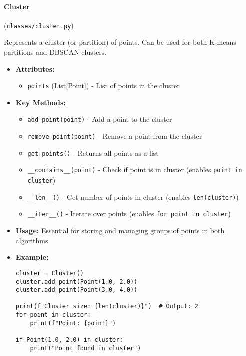 \documentclass[
english,
smallborders
]{i6prcsht}
\begin{document}
\vspace*{0.3cm}

\paragraph{Cluster} (\texttt{classes/cluster.py})

Represents a cluster (or partition) of points. Can be used for both K-means partitions and DBSCAN clusters.

\begin{itemize}
	\item \textbf{Attributes:}
	      \begin{itemize}
		      \item \texttt{points} (List[Point]) - List of points in the cluster
	      \end{itemize}
	\item \textbf{Key Methods:}
	      \begin{itemize}
		      \item \texttt{add\_point(point)} - Add a point to the cluster
		      \item \texttt{remove\_point(point)} - Remove a point from the cluster
		      \item \texttt{get\_points()} - Returns all points as a list
		      \item \texttt{\_\_contains\_\_(point)} - Check if point is in cluster (enables \texttt{point in cluster})
		      \item \texttt{\_\_len\_\_()} - Get number of points in cluster (enables \texttt{len(cluster)})
		      \item \texttt{\_\_iter\_\_()} - Iterate over points (enables \texttt{for point in cluster})
	      \end{itemize}
	\item \textbf{Usage:} Essential for storing and managing groups of points in both algorithms
	\item \textbf{Example:}
	      \begin{lstlisting}
cluster = Cluster()
cluster.add_point(Point(1.0, 2.0))
cluster.add_point(Point(3.0, 4.0))

print(f"Cluster size: {len(cluster)}")  # Output: 2
for point in cluster:
    print(f"Point: {point}")

if Point(1.0, 2.0) in cluster:
    print("Point found in cluster")
    \end{lstlisting}
\end{itemize}

\vspace*{0.3cm}
\end{document}
